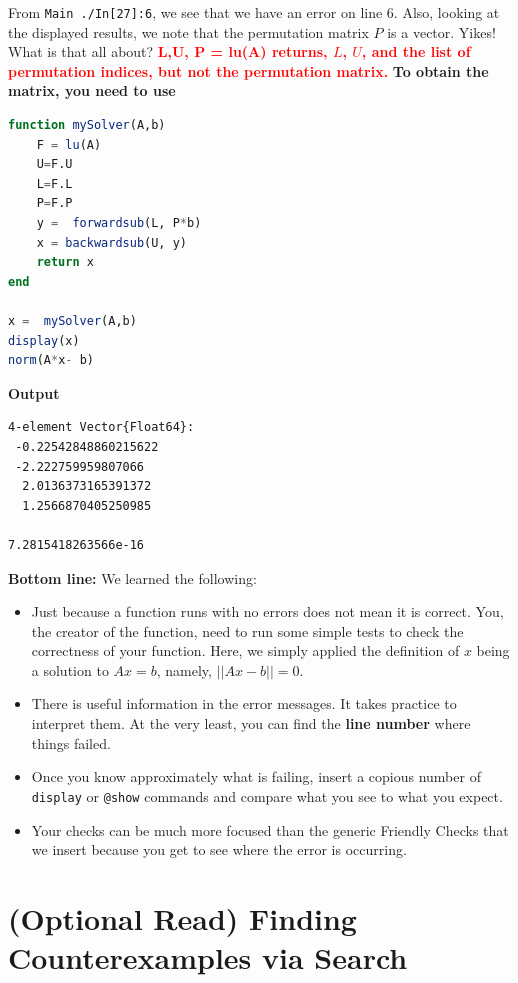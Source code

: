 From \texttt{\@ Main ./In[27]:6}, we see that we have an error on line 6. Also, looking at the displayed results, we note that the permutation matrix $P$ is a vector. Yikes! What is that all about? \textcolor{red}{\bf L,U, P = lu(A) returns, $L$, $U$, and the list of permutation indices, but not the permutation matrix.} \textbf{To obtain the matrix, you need to use }

\begin{lstlisting}[language=Julia,style=mystyle]
function mySolver(A,b)
    F = lu(A)
    U=F.U
    L=F.L
    P=F.P
    y =  forwardsub(L, P*b)
    x = backwardsub(U, y)
    return x
end 

x =  mySolver(A,b)
display(x)
norm(A*x- b)
\end{lstlisting}
\textbf{Output} 
\begin{verbatim}
4-element Vector{Float64}:
 -0.22542848860215622
 -2.222759959807066
  2.0136373165391372
  1.2566870405250985
  
7.2815418263566e-16
\end{verbatim}

\textbf{Bottom line:} We learned the following:
\begin{itemize}
    \item Just because a function runs with no errors does not mean it is correct. You, the creator of the function, need to run some simple tests to check the correctness of your function. Here, we simply applied the definition of $x$ being a solution to $Ax=b$, namely, $||Ax-b||=0$.

    \item There is useful information in the error messages. It takes practice to interpret them. At the very least, you can find the \textbf{line number} where things failed.

    \item Once you know approximately what is failing, insert a copious number of \texttt{display} or \texttt{@show} commands and compare what you see to what you expect. 

    \item Your checks can be much more focused than the generic Friendly Checks that we insert because you get to see where the error is occurring. 
\end{itemize}


\section{(Optional Read) Finding Counterexamples via Search}

